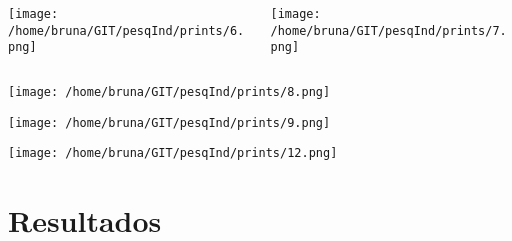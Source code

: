 \begin{frame}

\begin{columns}
 \begin{column}{.3\textwidth}

  \begin{center}
   \texttt{[image: /home/bruna/GIT/pesqInd/prints/6.png]}
  \end{center}

 \end{column}
 \begin{column}{.7\textwidth}

  \begin{center}
   \texttt{[image: /home/bruna/GIT/pesqInd/prints/7.png]}
  \end{center}

 \end{column}
\end{columns}

\end{frame}

\begin{frame}

\begin{center}
 \texttt{[image: /home/bruna/GIT/pesqInd/prints/8.png]}
\end{center}

\end{frame}

\begin{frame}

\vspace{-.15cm}\begin{center}
 \texttt{[image: /home/bruna/GIT/pesqInd/prints/9.png]}
\end{center}

\end{frame}

\begin{frame}

\vspace{-.25cm}\begin{center}
 \texttt{[image: /home/bruna/GIT/pesqInd/prints/12.png]}
\end{center}

\end{frame}

\section{Resultados}\label{resultados}


